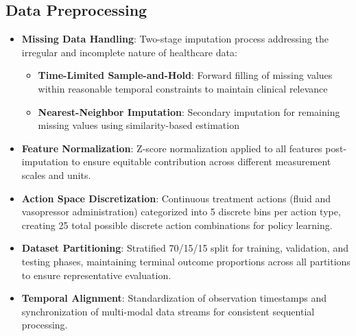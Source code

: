 \subsection*{Data Preprocessing}
\begin{itemize}
    \item \textbf{Missing Data Handling}: Two-stage imputation process addressing the irregular and incomplete nature of healthcare data:
    \begin{itemize}
        \item \textbf{Time-Limited Sample-and-Hold}: Forward filling of missing values within reasonable temporal constraints to maintain clinical relevance
        \item \textbf{Nearest-Neighbor Imputation}: Secondary imputation for remaining missing values using similarity-based estimation
    \end{itemize}
    \item \textbf{Feature Normalization}: Z-score normalization applied to all features post-imputation to ensure equitable contribution across different measurement scales and units.
    \item \textbf{Action Space Discretization}: Continuous treatment actions (fluid and vasopressor administration) categorized into 5 discrete bins per action type, creating 25 total possible discrete action combinations for policy learning.
    \item \textbf{Dataset Partitioning}: Stratified 70/15/15 split for training, validation, and testing phases, maintaining terminal outcome proportions across all partitions to ensure representative evaluation.
    \item \textbf{Temporal Alignment}: Standardization of observation timestamps and synchronization of multi-modal data streams for consistent sequential processing.
\end{itemize}

